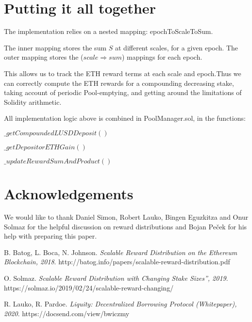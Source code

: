 \documentclass[reqno]{article}
\begin{document}
\bigskip
\section{Putting it all together}

\bigskip
The implementation relies on a nested mapping: epochToScaleToSum. 

\bigskip
The inner mapping stores the sum $S$ at different scales, for a given epoch. The outer mapping stores the ($scale \Rightarrow sum$) mappings for each epoch.

\bigskip
This allows us to track the ETH reward terms at each scale and epoch.Thus we can correctly compute the ETH rewards for a compounding decreasing stake, taking account of periodic Pool-emptying, and getting around the limitations of Solidity arithmetic.

\bigskip
All implementation logic above is combined in PoolManager.sol, in the functions:

\bigskip
$\_getCompoundedLUSDDeposit()$

$\_getDepositorETHGain()$

$\_updateRewardSumAndProduct()$

\section{Acknowledgements}
We would like to thank Daniel Simon, Robert Lauko, Bingen Eguzkitza and Onur Solmaz for the helpful discussion on reward distributions and Bojan Peček for his help with preparing this paper.

\begin{thebibliography}{9}
B. Batog, L. Boca, N. Johnson.
\textit{Scalable Reward Distribution on the Ethereum Blockchain, 2018}. 
http://batog.info/papers/scalable-reward-distribution.pdf

O. Solmaz. 
\textit{Scalable Reward Distribution with Changing Stake Sizes”, 2019}. 
https://solmaz.io/2019/02/24/scalable-reward-changing/

R. Lauko, R. Pardoe. 
\textit{Liquity: Decentralized Borrowing Protocol (Whitepaper), 2020}. 
https://docsend.com/view/bwiczmy


\end{thebibliography}
\end{document}
